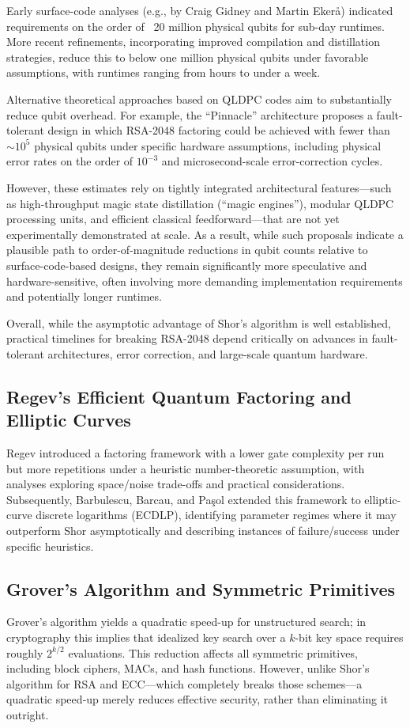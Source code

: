 \documentclass[11pt,a4paper]{article}
\begin{document}
Early surface-code analyses (e.g., by Craig Gidney and Martin Ekerå) indicated requirements on the order of ~20 million physical qubits for sub-day runtimes. More recent refinements, incorporating improved compilation and distillation strategies, reduce this to below one million physical qubits under favorable assumptions, with runtimes ranging from hours to under a week.\cite{gidney2025}

Alternative theoretical approaches based on QLDPC codes aim to substantially reduce qubit overhead. For example, the “Pinnacle” architecture\cite{webster2026} proposes a fault-tolerant design in which RSA-2048 factoring could be achieved with fewer than $\sim 10^5$ physical qubits under specific hardware assumptions, including physical error rates on the order of $10^{-3}$ and microsecond-scale error-correction cycles.

However, these estimates rely on tightly integrated architectural features—such as high-throughput magic state distillation (“magic engines”), modular QLDPC processing units, and efficient classical feedforward—that are not yet experimentally demonstrated at scale. As a result, while such proposals indicate a plausible path to order-of-magnitude reductions in qubit counts relative to surface-code-based designs, they remain significantly more speculative and hardware-sensitive, often involving more demanding implementation requirements and potentially longer runtimes.

Overall, while the asymptotic advantage of Shor’s algorithm is well established, practical timelines for breaking RSA-2048 depend critically on advances in fault-tolerant architectures, error correction, and large-scale quantum hardware.
\subsection{Regev's Efficient Quantum Factoring and Elliptic Curves}
Regev introduced a factoring framework with a lower gate complexity per run but more repetitions under a heuristic number-theoretic assumption, with analyses exploring space/noise trade-offs and practical considerations.\cite{regev2024} Subsequently, Barbulescu, Barcau, and Pa\c{s}ol extended this framework to elliptic-curve discrete logarithms (ECDLP), identifying parameter regimes where it may outperform Shor asymptotically and describing instances of failure/success under specific heuristics.\cite{barbulescu2025}

\subsection{Grover's Algorithm and Symmetric Primitives}
Grover's algorithm yields a quadratic speed-up for unstructured search; in cryptography this implies that idealized key search over a $k$-bit key space requires roughly $2^{k/2}$ evaluations.\cite{grover1996,grovercost} This reduction affects all symmetric primitives, including block ciphers, MACs, and hash functions. However, unlike Shor’s algorithm for RSA and ECC—which completely breaks those schemes—a quadratic speed‑up merely reduces effective security, rather than eliminating it outright.
\end{document}
